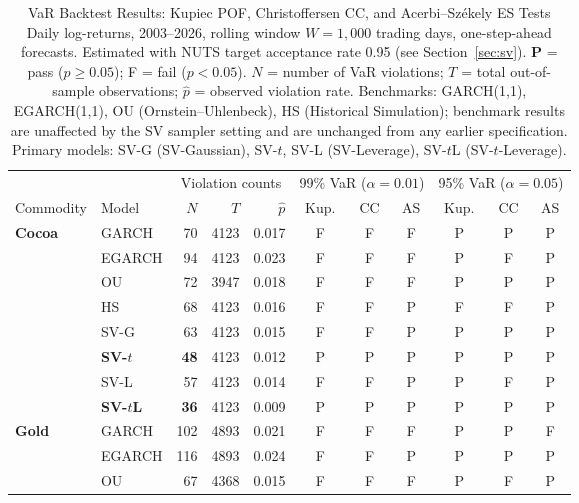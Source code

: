 \documentclass[preprint,12pt,authoryear]{elsarticle}
\begin{document}
\begin{table}[htbp]
\centering
\caption{VaR Backtest Results: Kupiec POF, Christoffersen CC, and Acerbi--Sz\'ekely
ES Tests\\[4pt]
\small
Daily log-returns, 2003--2026, rolling window $W=1{,}000$ trading days,
one-step-ahead forecasts. Estimated with NUTS target acceptance rate
0.95 (see Section~\ref{sec:sv}).
\textbf{P} = pass ($p \geq 0.05$); F = fail ($p < 0.05$).
$N$ = number of VaR violations; $T$ = total out-of-sample observations;
$\hat{p}$ = observed violation rate.
Benchmarks: GARCH(1,1), EGARCH(1,1), OU (Ornstein--Uhlenbeck),
HS (Historical Simulation); benchmark results are unaffected by the SV
sampler setting and are unchanged from any earlier specification.
Primary models: SV-G (SV-Gaussian), SV-$t$, SV-L (SV-Leverage),
SV-$t$L (SV-$t$-Leverage).}
\label{tab:backtest_main}
\vspace{6pt}
\small
\setlength{\tabcolsep}{5pt}
\begin{tabular}{ll rr r ccc ccc}
\toprule
& & \multicolumn{3}{c}{Violation counts} &
  \multicolumn{3}{c}{99\% VaR ($\alpha=0.01$)} &
  \multicolumn{3}{c}{95\% VaR ($\alpha=0.05$)} \\
\cmidrule(lr){3-5}\cmidrule(lr){6-8}\cmidrule(lr){9-11}
Commodity & Model & $N$ & $T$ & $\hat{p}$ &
  Kup. & CC & AS &
  Kup. & CC & AS \\
\midrule
\multirow{8}{*}{\textbf{Cocoa}}
  & GARCH      & 70  & 4123 & 0.017 & F & F & F & P & P & P \\
  & EGARCH     & 94  & 4123 & 0.023 & F & F & F & P & F & P \\
  & OU         & 72  & 3947 & 0.018 & F & F & F & P & P & P \\
  & HS         & 68  & 4123 & 0.016 & F & F & P & F & F & P \\
  & SV-G       & 63  & 4123 & 0.015 & F & F & P & P & P & P \\
  & \textbf{SV-$t$}     & \textbf{48}  & 4123 & 0.012 & P & P & P & P & P & P \\
  & SV-L       & 57  & 4123 & 0.014 & F & F & P & P & F & P \\
  & \textbf{SV-$t$L}& \textbf{36} & 4123 & 0.009 & P & P & P & P & P & P \\
\midrule
\multirow{8}{*}{\textbf{Gold}}
  & GARCH      & 102 & 4893 & 0.021 & F & F & F & P & P & F \\
  & EGARCH     & 116 & 4893 & 0.024 & F & F & P & P & P & P \\
  & OU         & 67  & 4368 & 0.015 & F & F & F & P & F & P \\

\end{tabular}
\end{table}
\end{document}
